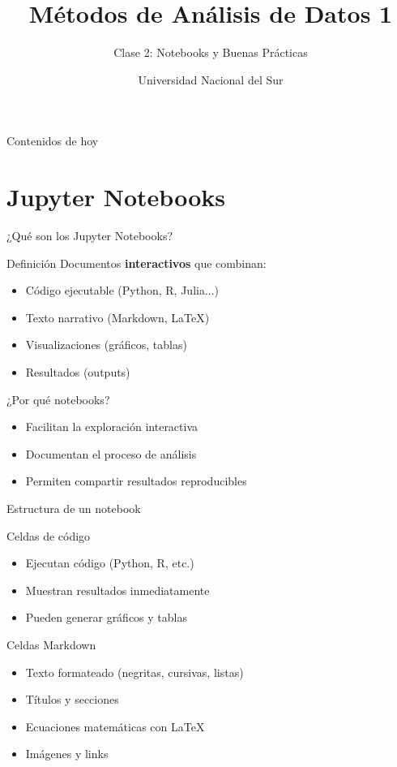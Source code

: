 \documentclass[aspectratio=169]{beamer}
\title{Métodos de Análisis de Datos 1}
\subtitle{Clase 2: Notebooks y Buenas Prácticas}
\author{Universidad Nacional del Sur}
\date{}
\begin{document}
\begin{frame}
\titlepage
\end{frame}

\begin{frame}{Contenidos de hoy}
\tableofcontents
\end{frame}

\section{Jupyter Notebooks}

\begin{frame}{¿Qué son los Jupyter Notebooks?}
\begin{block}{Definición}
Documentos \textbf{interactivos} que combinan:
\begin{itemize}
    \item Código ejecutable (Python, R, Julia...)
    \item Texto narrativo (Markdown, LaTeX)
    \item Visualizaciones (gráficos, tablas)
    \item Resultados (outputs)
\end{itemize}
\end{block}

\pause

\begin{exampleblock}{¿Por qué notebooks?}
\begin{itemize}
    \item Facilitan la exploración interactiva
    \item Documentan el proceso de análisis
    \item Permiten compartir resultados reproducibles
\end{itemize}
\end{exampleblock}
\end{frame}

\begin{frame}{Estructura de un notebook}
\begin{block}{Celdas de código}
\begin{itemize}
    \item Ejecutan código (Python, R, etc.)
    \item Muestran resultados inmediatamente
    \item Pueden generar gráficos y tablas
\end{itemize}
\end{block}

\begin{block}{Celdas Markdown}
\begin{itemize}
    \item Texto formateado (negritas, cursivas, listas)
    \item Títulos y secciones
    \item Ecuaciones matemáticas con \LaTeX
    \item Imágenes y links
\end{itemize}
\end{block}
\end{frame}
\end{document}
